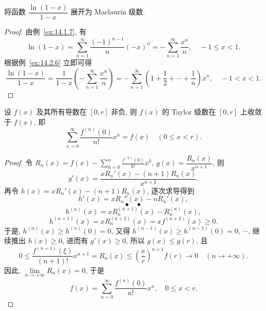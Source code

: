 \begin{example}\label{ex:14.2.7}
将函数 $\dfrac{\ln(1-x)}{1-x}$ 展开为 Maclaurin 级数.
\end{example}

\begin{proof}
由例~\ref{ex:14.1.7}, 有
\[
  \ln(1-x)=\sum_{n=1}^{\infty}\frac{(-1)^{n-1}}{n}(-x)^{n}=-\sum_{n=1}^{\infty}\frac{x^{n}}{n},\quad-1\leqslant x<1.
\]
根据例~\ref{ex:14.2.6} 立即可得
\[
  \frac{\ln(1-x)}{1-x}=\frac{1}{1-x}\left(-\sum_{n=1}^{\infty}\frac{x^{n}}{n}\right)=-\sum_{n=1}^{\infty}\left(1+\frac{1}{2}+\cdots+\frac{1}{n}\right)x^{n},\quad-1<x<1.
\]
\end{proof}

\begin{example}\label{ex:14.2.8}
设 $f(x)$ 及其所有导数在 $[0,r]$ 非负, 则 $f(x)$ 的 Taylor 级数在 $[0,r]$ 上收敛于 $f(x)$, 即
\[
  \sum_{n=0}^{\infty}\frac{f^{(n)}(0)}{n!}x^{n}=f(x)\quad(0\leqslant x<r).
\]
\end{example}

\begin{proof}
令 $R_{n}(x)=f(x)-\sum_{k=0}^{n}\frac{f^{(k)}(0)}{k!}x^{k}$, $g(x)=\dfrac{R_{n}(x)}{x^{n+1}}$, 则
\[
  g'(x)=\frac{xR_{n}'(x)-(n+1)R_{n}(x)}{x^{n+2}}.
\]
再令 $h(x)=xR_{n}'(x)-(n+1)R_{n}(x)$, 逐次求导得到
\[
  h'(x)=xR_{n}''(x)-nR_{n}'(x),
\]
\[
  \bullet\quad\bullet
\]
\[
  h^{(n)}(x)=xR_{n}^{(n+1)}(x)-R_{n}^{(n)}(x),
\]
\[
  h^{(n+1)}(x)=xR_{n}^{(n+2)}(x)=xf^{(n+2)}(x)\geqslant0.
\]
于是, $h^{(n)}(x)\geqslant h^{(n)}(0)=0$, 又得 $h^{(n-1)}(x)\geqslant h^{(n-1)}(0)=0$, $\cdots$, 继续推出 $h(x)\geqslant0$, 进而有 $g'(x)\geqslant0$, 所以 $g(x)\leqslant g(r)$, 且
\[
  0\leqslant\frac{f^{(n+1)}(\xi)}{(n+1)!}x^{n+1}=R_{n}(x)\leqslant\left(\frac{x}{r}\right)^{n+1}f(r)\to0\quad(n\to+\infty).
\]
因此, $\lim\limits_{n\to+\infty}R_{n}(x)=0$, 于是
\[
  f(x)=\sum_{n=0}^{\infty}\frac{f^{(n)}(0)}{n!}x^{n},\quad0\leqslant x<r.
\]
\end{proof}

